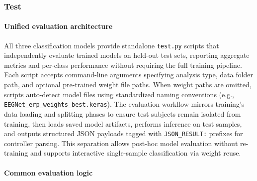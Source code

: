 \documentclass[12pt]{report}
\begin{document}
\subsubsection{Test}

\paragraph{Unified evaluation architecture}\mbox{}

All three classification models provide standalone \texttt{test.py} scripts that independently evaluate trained models on held-out test sets, reporting aggregate metrics and per-class performance without requiring the full training pipeline. Each script accepts command-line arguments specifying analysis type, data folder path, and optional pre-trained weight file paths. When weight paths are omitted, scripts auto-detect model files using standardized naming conventions (e.g., \texttt{EEGNet\_erp\_weights\_best.keras}). The evaluation workflow mirrors training's data loading and splitting phases to ensure test subjects remain isolated from training, then loads saved model artifacts, performs inference on test samples, and outputs structured JSON payloads tagged with \texttt{JSON\_RESULT:} prefixes for controller parsing. This separation allows post-hoc model evaluation without re-training and supports interactive single-sample classification via weight reuse.

\paragraph{Common evaluation logic}\mbox{}
\end{document}
